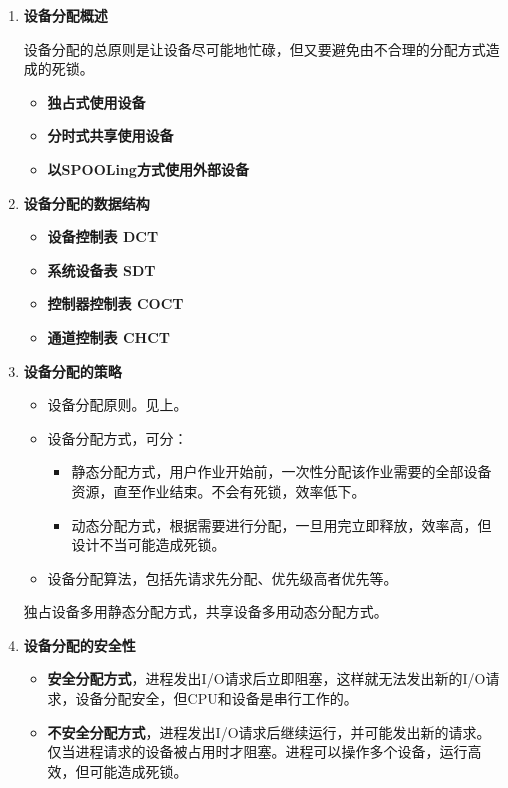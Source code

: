 \documentclass[12pt, a4paper, oneside]{ctexart}
\begin{document}
\begin{enumerate}
  \item {\bf 设备分配概述}
  
  设备分配的总原则是让设备尽可能地忙碌，但又要避免由不合理的分配方式造成的死锁。
  \begin{itemize}
    \item {\bf 独占式使用设备}
    \item {\bf 分时式共享使用设备}
    \item {\bf 以SPOOLing方式使用外部设备}
  \end{itemize}

  \item {\bf 设备分配的数据结构}
  
  \begin{itemize}
    \item {\bf 设备控制表 DCT}
    \item {\bf 系统设备表 SDT}
    \item {\bf 控制器控制表 COCT}
    \item {\bf 通道控制表 CHCT}
  \end{itemize}

  \item {\bf 设备分配的策略}
  
  \begin{itemize}
    \item 设备分配原则。见上。
    \item 设备分配方式，可分：
    \begin{itemize}
      \item 静态分配方式，用户作业开始前，一次性分配该作业需要的全部设备资源，直至作业结束。不会有死锁，效率低下。
      \item 动态分配方式，根据需要进行分配，一旦用完立即释放，效率高，但设计不当可能造成死锁。
    \end{itemize}
    \item 设备分配算法，包括先请求先分配、优先级高者优先等。
  \end{itemize}

  独占设备多用静态分配方式，共享设备多用动态分配方式。

  \item {\bf 设备分配的安全性}
  \begin{itemize}
    \item {\bf 安全分配方式}，进程发出I/O请求后立即阻塞，这样就无法发出新的I/O请求，设备分配安全，但CPU和设备是串行工作的。
    \item {\bf 不安全分配方式}，进程发出I/O请求后继续运行，并可能发出新的请求。仅当进程请求的设备被占用时才阻塞。进程可以操作多个设备，运行高效，但可能造成死锁。
  \end{itemize}


\end{enumerate}
\end{document}

